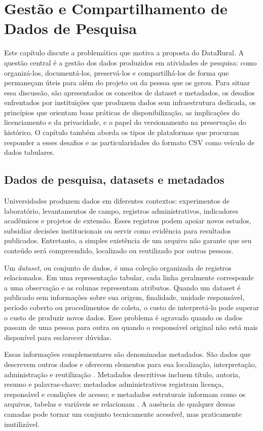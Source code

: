 \chapter{Gestão e Compartilhamento de Dados de Pesquisa}\label{chp:FUNDAMENTACAO}

Este capítulo discute a problemática que motiva a proposta do DataRural. A questão central é a gestão dos dados produzidos em atividades de pesquisa: como organizá-los, documentá-los, preservá-los e compartilhá-los de forma que permaneçam úteis para além do projeto ou da pessoa que os gerou. Para situar essa discussão, são apresentados os conceitos de dataset e metadados, os desafios enfrentados por instituições que produzem dados sem infraestrutura dedicada, os princípios que orientam boas práticas de disponibilização, as implicações do licenciamento e da privacidade, e o papel do versionamento na preservação do histórico. O capítulo também aborda os tipos de plataformas que procuram responder a esses desafios e as particularidades do formato CSV como veículo de dados tabulares.

\section{Dados de pesquisa, datasets e metadados}

Universidades produzem dados em diferentes contextos: experimentos de laboratório, levantamentos de campo, registros administrativos, indicadores acadêmicos e projetos de extensão. Esses registros podem apoiar novos estudos, subsidiar decisões institucionais ou servir como evidência para resultados publicados. Entretanto, a simples existência de um arquivo não garante que seu conteúdo será compreendido, localizado ou reutilizado por outras pessoas.

Um \textit{dataset}, ou conjunto de dados, é uma coleção organizada de registros relacionados. Em uma representação tabular, cada linha geralmente corresponde a uma observação e as colunas representam atributos. Quando um dataset é publicado sem informações sobre sua origem, finalidade, unidade responsável, período coberto ou procedimentos de coleta, o custo de interpretá-lo pode superar o custo de produzir novos dados. Esse problema é agravado quando os dados passam de uma pessoa para outra ou quando o responsável original não está mais disponível para esclarecer dúvidas.

Essas informações complementares são denominadas metadados. São dados que descrevem outros dados e oferecem elementos para sua localização, interpretação, administração e reutilização \cite{riley2017metadata}. Metadados descritivos incluem título, autoria, resumo e palavras-chave; metadados administrativos registram licença, responsável e condições de acesso; e metadados estruturais informam como os arquivos, tabelas e variáveis se relacionam \cite{riley2017metadata}. A ausência de qualquer dessas camadas pode tornar um conjunto tecnicamente acessível, mas praticamente inutilizável.

